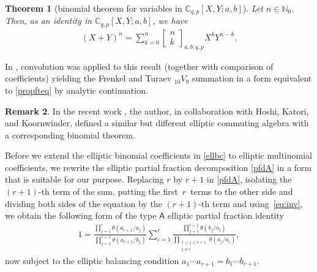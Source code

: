 \documentclass[pdftex]{sigma}
\numberwithin{equation}{section}
\newtheorem{Theorem}{Theorem}[section]
\theoremstyle{definition}
\newtheorem{Remark}[Theorem]{Remark}
\newcommand{\ta}{\theta}
\newcommand{\C}{\mathbb C}
\newcommand{\N}{\mathbb N}
\begin{document}
\begin{Theorem}[binomial theorem for %
 variables in ${\C_{q,p}[X,Y;a,b]}$]\label{ebthm}
 Let $n\in\N_0$.
 Then, as an identity in $\C_{q,p}[X,Y;a,b]$, we have
\begin{gather*}%
(X+Y)^n=\sum_{k=0}^n\begin{bmatrix}n\\k\end{bmatrix}_{a,b;q,p}X^kY^{n-k}.
\end{gather*}
\end{Theorem}

In \cite[Corollary~4]{S1}, convolution was applied to this result
(together with comparison of coefficients)
yielding the Frenkel and Turaev ${}_{10}V_9$ summation \cite{FT}
in a form equivalent to \eqref{propfteq} by analytic continuation.

\begin{Remark}\label{remHKKS}
In the recent work \cite[Definition~5.6 and Theorem~5.7]{HKKS}, the
author, in collaboration with Hoshi, Katori, and Koornwinder, defined
a similar but different elliptic commuting algebra
with a corresponding binomial theorem.
\end{Remark}

Before we extend the elliptic binomial coefficients in \eqref{ellbc}
to elliptic multinomial coefficients, we rewrite the elliptic
partial fraction decomposition \eqref{pfdA} in a form that
is suitable for our purpose.
Replacing $r$ by $r+1$ in \eqref{pfdA},
isolating the $(r+1)$-th term of the sum, putting the first~$r$~terms to the other side and dividing both sides of the
equation by the $(r+1)$-th term and using~\eqref{eq:inv},
we obtain the following
form of the type $\mathsf A$ elliptic partial fraction identity
\begin{gather}\label{pfd}
 1=\frac{\prod_{j=1}^r\ta(a_{r+1}/a_j)}
 {\prod_{j=1}^{r+1}\ta(a_{r+1}/b_j)}
 \sum_{i=1}^r\frac{\prod_{j=1}^{r+1}\ta(b_j/a_i)}
 {\prod_{\substack{1\le j\le r+1\\j\neq i}}\ta(a_j/a_i)},
\end{gather}
now subject to the elliptic balancing condition
$a_1\cdots a_{r+1}=b_1\cdots b_{r+1}$.
\end{document}
